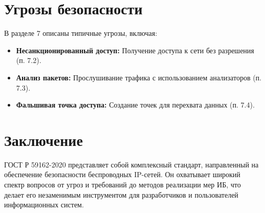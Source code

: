 \section*{Угрозы безопасности}
В разделе 7 описаны типичные угрозы, включая:
\begin{itemize}
    \item \textbf{Несанкционированный доступ:} Получение доступа к сети без разрешения (п. 7.2).
    \item \textbf{Анализ пакетов:} Прослушивание трафика с использованием анализаторов (п. 7.3).
    \item \textbf{Фальшивая точка доступа:} Создание точек для перехвата данных (п. 7.4).
\end{itemize}
\section*{Заключение}
ГОСТ Р 59162-2020 представляет собой комплексный стандарт, направленный на обеспечение безопасности беспроводных IP-сетей.
Он охватывает широкий спектр вопросов от угроз и требований до методов реализации мер ИБ, что делает его незаменимым
инструментом для разработчиков и пользователей информационных систем.
